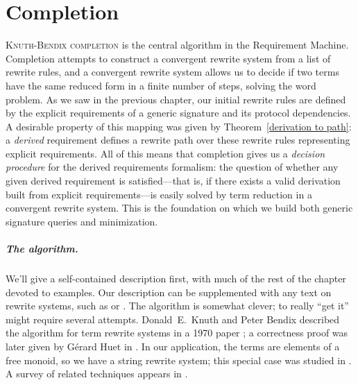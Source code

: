 \documentclass[../generics]{subfiles}
\begin{document}
\chapter{Completion}\label{completion}

%
\lettrine{K}{nuth-Bendix completion} is the central algorithm in the Requirement Machine. Completion attempts to construct a convergent rewrite system from a list of rewrite rules, and a convergent rewrite system allows us to decide if two terms have the same reduced form in a finite number of steps, solving the word problem. As we saw in the previous chapter, our initial rewrite rules are defined by the explicit requirements of a generic signature and its protocol dependencies. A desirable property of this mapping was given by Theorem~\ref{derivation to path}: a \emph{derived} requirement defines a rewrite path over these rewrite rules representing explicit requirements. All of this means that completion gives us a \emph{decision procedure} for the derived requirements formalism: the question of whether any given derived requirement is satisfied---that is, if there exists a valid derivation built from explicit requirements---is easily solved by term reduction in a convergent rewrite system. This is the foundation on which we build both generic signature queries and minimization.

\paragraph{The algorithm.} We'll give a self-contained description first, with much of the rest of the chapter devoted to examples. Our description can be supplemented with any text on rewrite systems, such as \cite{book2012string} or \cite{andallthat}. The algorithm is somewhat clever; to really ``get it'' might require several attempts. Donald~E.~Knuth and Peter Bendix described the algorithm for term rewrite systems in a 1970 paper \cite{Knuth1983}; a correctness proof was later given by G\'erard Huet in \cite{HUET198111}. In our application, the terms are elements of a free monoid, so we have a string rewrite system; this special case was studied in \cite{narendran}. A survey of related techniques appears in \cite{BUCHBERGER19873}.
\end{document}
